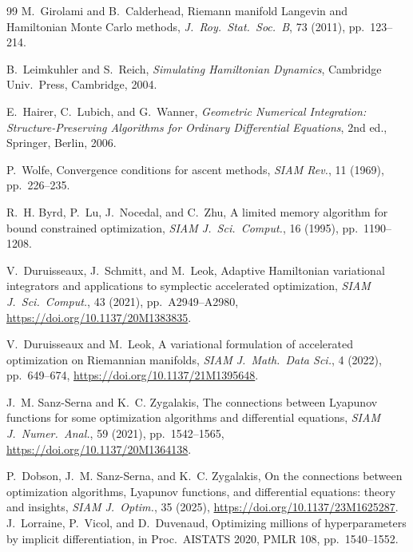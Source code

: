 \documentclass[11pt]{article}
\begin{document}
\begin{thebibliography}{99}
M.~Girolami and B.~Calderhead,
Riemann manifold Langevin and Hamiltonian Monte Carlo methods,
\textit{J.\ Roy.\ Stat.\ Soc.\ B}, 73 (2011), pp.~123--214.

B.~Leimkuhler and S.~Reich,
\textit{Simulating Hamiltonian Dynamics},
Cambridge Univ.\ Press, Cambridge, 2004.

E.~Hairer, C.~Lubich, and G.~Wanner,
\textit{Geometric Numerical Integration: Structure-Preserving Algorithms
for Ordinary Differential Equations}, 2nd ed.,
Springer, Berlin, 2006.

P.~Wolfe,
Convergence conditions for ascent methods,
\textit{\color{blue} SIAM Rev.}, 11 (1969), pp.~226--235.

R.~H. Byrd, P.~Lu, J.~Nocedal, and C.~Zhu,
A limited memory algorithm for bound constrained optimization,
\textit{\color{blue} SIAM J.\ Sci.\ Comput.}, 16 (1995), pp.~1190--1208.

V.~Duruisseaux, J.~Schmitt, and M.~Leok,
Adaptive Hamiltonian variational integrators and applications to
symplectic accelerated optimization,
\textit{\color{blue} SIAM J.\ Sci.\ Comput.}, 43 (2021), pp.~A2949--A2980,
\url{https://doi.org/10.1137/20M1383835}.

V.~Duruisseaux and M.~Leok,
A variational formulation of accelerated optimization on Riemannian
manifolds,
\textit{\color{blue} SIAM J.\ Math.\ Data Sci.}, 4 (2022), pp.~649--674,
\url{https://doi.org/10.1137/21M1395648}.

J.~M. Sanz-Serna and K.~C. Zygalakis,
The connections between Lyapunov functions for some optimization
algorithms and differential equations,
\textit{\color{blue} SIAM J.\ Numer.\ Anal.}, 59 (2021), pp.~1542--1565,
\url{https://doi.org/10.1137/20M1364138}.

P.~Dobson, J.~M. Sanz-Serna, and K.~C. Zygalakis,
On the connections between optimization algorithms, Lyapunov functions,
and differential equations: theory and insights,
\textit{\color{blue} SIAM J.\ Optim.}, 35 (2025),
\url{https://doi.org/10.1137/23M1625287}.
J.~Lorraine, P.~Vicol, and D.~Duvenaud,
Optimizing millions of hyperparameters by implicit differentiation,
in Proc.\ AISTATS 2020, PMLR 108, pp.~1540--1552.


\end{thebibliography}
\end{document}
